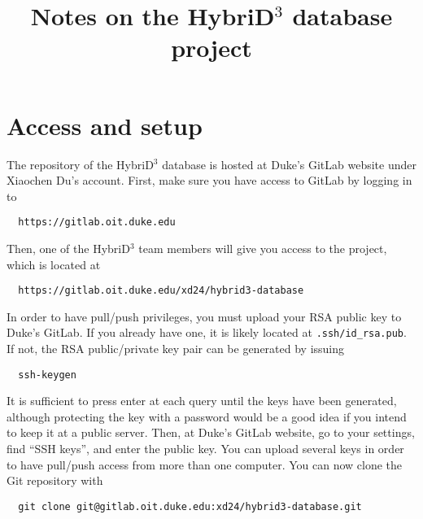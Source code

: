 \documentclass{article}
\title{Notes on the HybriD$^3$ database project}
\begin{document}
\maketitle

\section{Access and setup}

The repository of the HybriD$^3$ database is hosted at Duke's GitLab website under Xiaochen Du's account. First, make sure you have access to GitLab by logging in to
\lstset{language=Bash}
\begin{lstlisting}
  https://gitlab.oit.duke.edu
\end{lstlisting}
Then, one of the HybriD$^3$ team members will give you access to the project, which is located at
\begin{lstlisting}
  https://gitlab.oit.duke.edu/xd24/hybrid3-database
\end{lstlisting}
In order to have pull/push privileges, you must upload your RSA public key to Duke's GitLab. If you already have one, it is likely located at \verb+.ssh/id_rsa.pub+. If not, the RSA public/private key pair can be generated by issuing
\begin{lstlisting}
  ssh-keygen
\end{lstlisting}
It is sufficient to press enter at each query until the keys have been generated, although protecting the key with a password would be a good idea if you intend to keep it at a public server. Then, at Duke's GitLab website, go to your settings, find ``SSH keys'', and enter the public key. You can upload several keys in order to have pull/push access from more than one computer. You can now clone the Git repository with
\begin{lstlisting}
  git clone git@gitlab.oit.duke.edu:xd24/hybrid3-database.git
\end{lstlisting}
\end{document}
